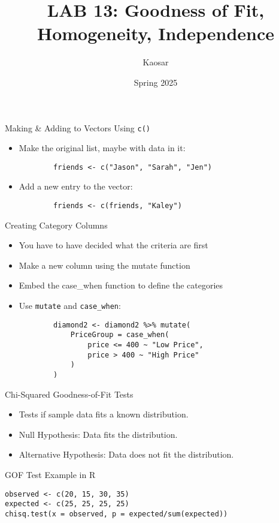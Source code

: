 \documentclass{beamer}
\title[STAT 3611]{LAB 13: Goodness of Fit, Homogeneity, Independence}
\author{Kaosar}
\institute{Auburn University}
\date{Spring 2025}
\begin{document}
\begin{frame}
    \titlepage
\end{frame}

\begin{frame}[fragile]{Making \& Adding to Vectors Using \texttt{c()}}
    \begin{itemize}
        \item Make the original list, maybe with data in it:
        \begin{verbatim}
        friends <- c("Jason", "Sarah", "Jen")
        \end{verbatim}
        \item Add a new entry to the vector:
        \begin{verbatim}
        friends <- c(friends, "Kaley")
        \end{verbatim}
    \end{itemize}
\end{frame}

\begin{frame}[fragile]{Creating Category Columns}
    \begin{itemize}
    \item You have to have decided what the criteria are first
    \item Make a new column using the mutate function
    \item Embed the case\_when function to define the categories
        \item Use \texttt{mutate} and \texttt{case\_when}:
        \begin{verbatim}
        diamond2 <- diamond2 %>% mutate(
            PriceGroup = case_when(
                price <= 400 ~ "Low Price",
                price > 400 ~ "High Price"
            )
        )
        \end{verbatim}
    \end{itemize}
\end{frame}

\begin{frame}{Chi-Squared Goodness-of-Fit Tests}
    \begin{itemize}
        \item Tests if sample data fits a known distribution.
        \item Null Hypothesis: Data fits the distribution.
        \item Alternative Hypothesis: Data does not fit the distribution.
    \end{itemize}
\end{frame}
\begin{frame}[fragile]{GOF Test Example in R}
\begin{verbatim}
observed <- c(20, 15, 30, 35)
expected <- c(25, 25, 25, 25)
chisq.test(x = observed, p = expected/sum(expected))
\end{verbatim}
\end{frame}
\end{document}
